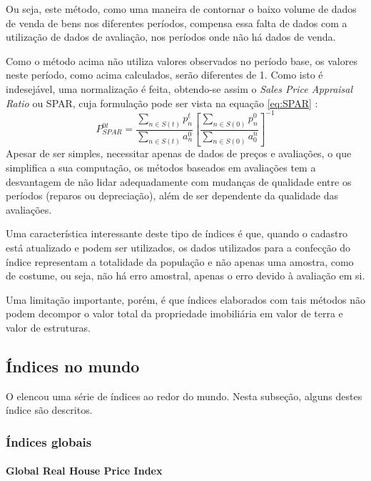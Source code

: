 \documentclass[
	12pt,				%
	oneside,			%
	a4paper,			%
	chapter=TITLE,		%
	section=TITLE,		%
	english,			%
	brazil				%
	]{abntex2}
\begin{document}
Ou seja, este método, como uma maneira de contornar o baixo volume de dados de
venda de bens nos diferentes períodos, compensa essa falta de dados com a
utilização de dados de avaliação, nos períodos onde não há dados de venda.

Como o método acima não utiliza valores observados no período base, os valores
neste período, como acima calculados, serão diferentes de 1. Como isto é
indesejável, uma normalização é feita, obtendo-se assim o \emph{Sales Price Appraisal
Ratio} ou SPAR, cuja formulação pode ser vista na equação \eqref{eq:SPAR}
\autocite[75]{rppi}:
\begin{equation}
P_{SPAR}^{0t} = \frac{\sum\limits_{n \in S(t)} p_n^t}{\sum\limits_{n \in S(t)} a_n^0} \left [ \frac{\sum\limits_{n \in S(0)} p_n^0}{\sum\limits_{n \in S(0)} a_0^n} \right ]^{-1}
\label{eq:SPAR}
\end{equation}
Apesar de ser simples, necessitar apenas de dados de preços e avaliações, o que
simplifica a sua computação, os métodos baseados em avaliações tem a desvantagem
de não lidar adequadamente com mudanças de qualidade entre os períodos (reparos
ou depreciação), além de ser dependente da qualidade das avaliações.

Uma característica interessante deste tipo de índices é que, quando o cadastro
está atualizado e podem ser utilizados, os dados utilizados para a confecção do
índice representam a totalidade da população e não apenas uma amostra, como de
costume, ou seja, não há erro amostral, apenas o erro devido à avaliação em si.

Uma limitação importante, porém, é que índices elaborados com tais métodos não
podem decompor o valor total da propriedade imobiliária em valor de terra e
valor de estruturas.

\hypertarget{uxedndices-no-mundo}{%
\subsection{Índices no mundo}\label{uxedndices-no-mundo}}

O \textcite{rppi} elencou uma série de índices ao redor do mundo. Nesta subseção, alguns destes índice são descritos.

\hypertarget{uxedndices-globais}{%
\subsubsection{Índices globais}\label{uxedndices-globais}}

\hypertarget{global-real-house-price-index}{%
\paragraph{Global Real House Price Index}\label{global-real-house-price-index}}
\end{document}
